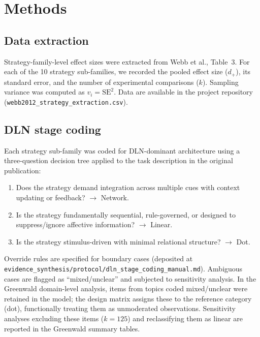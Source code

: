 \documentclass[11pt]{article}
\begin{document}




\clearpage
\section*{Methods}
\setcounter{section}{0}
\renewcommand{\thesection}{M\arabic{section}}

\subsection{Data extraction}

Strategy-family-level effect sizes were extracted from Webb et
al.\cite{Webb2012}, Table~3. For each of the 10 strategy sub-families,
we recorded the pooled effect size ($d_+$), its standard error, and the
number of experimental comparisons ($k$). Sampling variance was computed
as $v_i = \text{SE}^2$. Data are available in the project repository
(\texttt{webb2012\_strategy\_extraction.csv}).


\subsection{DLN stage coding}

Each strategy sub-family was coded for DLN-dominant architecture using a
three-question decision tree applied to the task description in the
original publication:
\begin{enumerate}[nosep]
\item Does the strategy demand integration across multiple cues with
context updating or feedback? $\to$ Network.
\item Is the strategy fundamentally sequential, rule-governed, or
designed to suppress/ignore affective information? $\to$ Linear.
\item Is the strategy stimulus-driven with minimal relational structure?
$\to$ Dot.
\end{enumerate}
Override rules are specified for boundary cases (deposited at
\texttt{evidence\_synthesis/protocol/dln\_stage\_coding\_manual.md}).
Ambiguous cases are flagged as ``mixed/unclear'' and
subjected to sensitivity analysis. In the Greenwald domain-level
analysis, items from topics coded mixed/unclear were retained in the
model; the design matrix assigns these to the reference category
(dot), functionally treating them as unmoderated observations.
Sensitivity analyses excluding these items ($k = 125$) and
reclassifying them as linear are reported in the Greenwald summary
tables.
\end{document}
